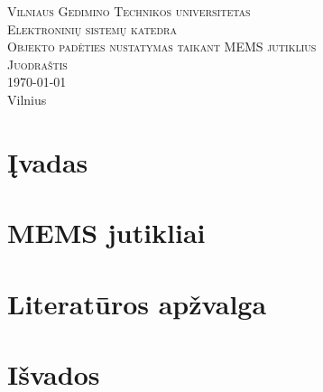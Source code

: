 \documentclass[11pt, a4paper]{article}
\begin{document}
  \begin{titlepage}
    \begin{center}
      \textsc{\LARGE Vilniaus Gedimino Technikos universitetas}\\[2mm]
      \textsc{\Large Elektroninių sistemų katedra}\\[70mm]
      \textsc{\Large Objekto padėties nustatymas taikant MEMS jutiklius}\\[60mm]
      \textsc{\Large Juodraštis}\\
      {\large \today  \ \currenttime}\\
      \vfill
      {\large Vilnius \\ \the\year}
    \end{center}
  \end{titlepage}

  \section{Įvadas}

  

  \section{MEMS jutikliai}

  

  \section{Literatūros apžvalga}

  

  \section{Išvados}

  

  \newpage

  
  
\end{document}
